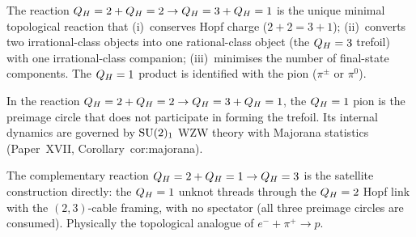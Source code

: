\begin{theorem}
\label{P18:thm:pion_forced}
The reaction $Q_H=2+Q_H=2\to Q_H=3+Q_H=1$ is the unique minimal
topological reaction that (i)~conserves Hopf charge ($2+2=3+1$);
(ii)~converts two irrational-class objects into one rational-class
object (the $Q_H=3$ trefoil) with one irrational-class companion;
(iii)~minimises the number of final-state components. The $Q_H=1$
product is identified with the pion ($\pi^\pm$ or $\pi^0$).
\end{theorem}

\begin{corollary}
\label{P18:cor:pion_spectator}
In the reaction $Q_H=2+Q_H=2\to Q_H=3+Q_H=1$, the $Q_H=1$ pion is the
preimage circle that does not participate in forming the trefoil.
Its internal dynamics are governed by $\mathrm{SU}(2)_1$ WZW theory with
Majorana statistics (Paper~XVII, Corollary~cor:majorana).
\end{corollary}

\begin{remark}[$\QH=2+\QH=1$ reaction]
\label{P18:rem:qh2_qh1}
The complementary reaction $Q_H=2+Q_H=1\to Q_H=3$ is the satellite
construction directly: the $Q_H=1$ unknot threads through the
$Q_H=2$ Hopf link with the $(2,3)$-cable framing, with no spectator
(all three preimage circles are consumed). Physically the
topological analogue of $e^-+\pi^+\to p$.
\end{remark}

